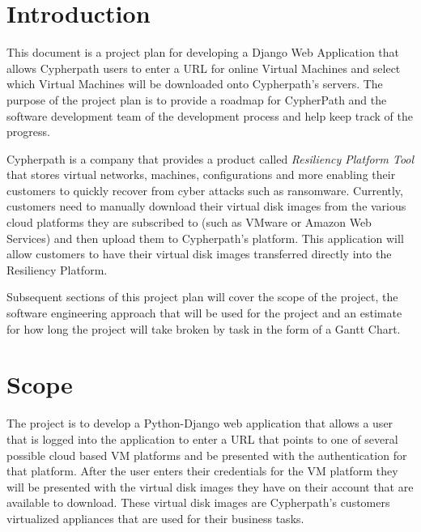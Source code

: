 \documentclass{article}
\title{}
\author{}
\date{}
\begin{document}
    

    \tableofcontents
    \newpage
    \listoffigures

    \newpage
    \begin{versionhistory}
    \end{versionhistory}
    \newpage


    \section{Introduction}
    This document is a project plan for developing a Django Web Application that allows Cypherpath users to enter
    a URL for online Virtual Machines and select which Virtual Machines will be downloaded onto Cypherpath's 
    servers. The purpose of the project plan is to provide a roadmap for CypherPath and the software development
    team of the development process and help keep track of the progress.

    Cypherpath is a company that provides a product called \textit{Resiliency Platform Tool} that stores virtual networks, machines, configurations and more
    enabling their customers to quickly recover from cyber attacks such as ransomware. Currently, customers need to manually download their virtual disk images from
    the various cloud platforms they are subscribed to (such as VMware or Amazon Web Services) and then upload them to Cypherpath's platform. This application will allow
    customers to have their virtual disk images transferred directly into the Resiliency Platform.

    Subsequent sections of this project plan will cover the scope of the project, the software engineering
    approach that will be used for the project and an estimate for how long the project will take broken by task
    in the form of a Gantt Chart.

    \section{Scope}
    The project is to develop a Python-Django web application that allows a user that is logged into the application to enter a URL that points to one of several
    possible cloud based VM platforms and be presented with the authentication for that platform. After the user enters their credentials for the VM platform 
    they will be presented with the virtual disk images they have on their account that are available to download. These virtual disk images are Cypherpath's customers
    virtualized appliances that are used for their business tasks.
    
\end{document}
